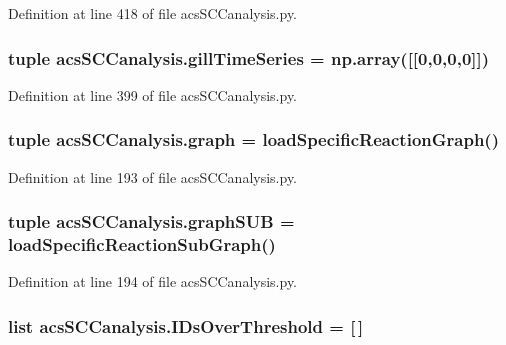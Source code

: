 Definition at line 418 of file acs\-S\-C\-Canalysis.\-py.

\hypertarget{a00102_a99669fe823cebc560b46c3746f9183e7}{
\subsubsection[{gill\-Time\-Series}]{\setlength{\rightskip}{0pt plus 5cm}tuple acs\-S\-C\-Canalysis.\-gill\-Time\-Series = np.\-array(\mbox{[}\mbox{[}0,0,0,0\mbox{]}\mbox{]})}}\label{a00102_a99669fe823cebc560b46c3746f9183e7}


Definition at line 399 of file acs\-S\-C\-Canalysis.\-py.

\hypertarget{a00102_ab45392da38059bf7557c22cbc73e5580}{
\subsubsection[{graph}]{\setlength{\rightskip}{0pt plus 5cm}tuple acs\-S\-C\-Canalysis.\-graph = {\bf load\-Specific\-Reaction\-Graph}()}}\label{a00102_ab45392da38059bf7557c22cbc73e5580}


Definition at line 193 of file acs\-S\-C\-Canalysis.\-py.

\hypertarget{a00102_ae307841da4a073fad4f6eaa172b0b970}{
\subsubsection[{graph\-S\-U\-B}]{\setlength{\rightskip}{0pt plus 5cm}tuple acs\-S\-C\-Canalysis.\-graph\-S\-U\-B = {\bf load\-Specific\-Reaction\-Sub\-Graph}()}}\label{a00102_ae307841da4a073fad4f6eaa172b0b970}


Definition at line 194 of file acs\-S\-C\-Canalysis.\-py.

\hypertarget{a00102_a578f0f0f1e87579d73b11f8720610b1e}{
\subsubsection[{I\-Ds\-Over\-Threshold}]{\setlength{\rightskip}{0pt plus 5cm}list acs\-S\-C\-Canalysis.\-I\-Ds\-Over\-Threshold = \mbox{[}$\,$\mbox{]}}}\label{a00102_a578f0f0f1e87579d73b11f8720610b1e}


